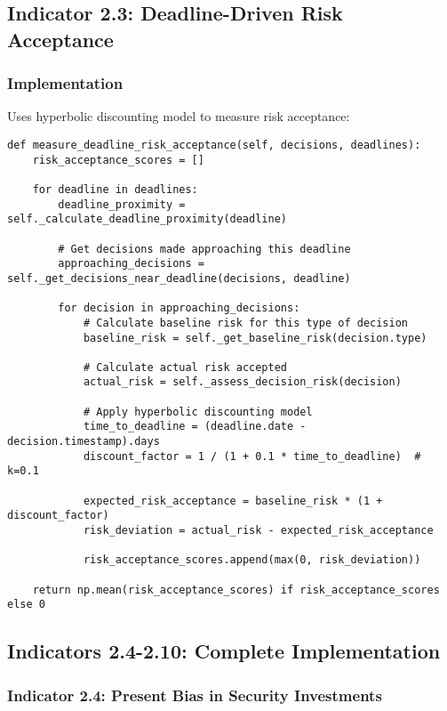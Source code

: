 \documentclass[11pt, onecolumn]{article}
\begin{document}
\subsection{Indicator 2.3: Deadline-Driven Risk Acceptance}

\subsubsection{Implementation}

Uses hyperbolic discounting model to measure risk acceptance:

\begin{lstlisting}
def measure_deadline_risk_acceptance(self, decisions, deadlines):
    risk_acceptance_scores = []
    
    for deadline in deadlines:
        deadline_proximity = self._calculate_deadline_proximity(deadline)
        
        # Get decisions made approaching this deadline
        approaching_decisions = self._get_decisions_near_deadline(decisions, deadline)
        
        for decision in approaching_decisions:
            # Calculate baseline risk for this type of decision
            baseline_risk = self._get_baseline_risk(decision.type)
            
            # Calculate actual risk accepted
            actual_risk = self._assess_decision_risk(decision)
            
            # Apply hyperbolic discounting model
            time_to_deadline = (deadline.date - decision.timestamp).days
            discount_factor = 1 / (1 + 0.1 * time_to_deadline)  # k=0.1
            
            expected_risk_acceptance = baseline_risk * (1 + discount_factor)
            risk_deviation = actual_risk - expected_risk_acceptance
            
            risk_acceptance_scores.append(max(0, risk_deviation))
    
    return np.mean(risk_acceptance_scores) if risk_acceptance_scores else 0
\end{lstlisting}

\subsection{Indicators 2.4-2.10: Complete Implementation}

\subsubsection{Indicator 2.4: Present Bias in Security Investments}
\end{document}
